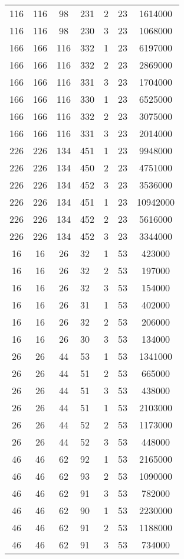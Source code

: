 \documentclass[a4paper,11pt]{article}
\begin{document}
\begin{longtable}{ |c|c|c|p{3cm}|c|c|c| }
116 & 116 & 98 & 231 & 2 & 23 & 1614000 \\
116 & 116 & 98 & 230 & 3 & 23 & 1068000 \\
166 & 166 & 116 & 332 & 1 & 23 & 6197000 \\
166 & 166 & 116 & 332 & 2 & 23 & 2869000 \\
166 & 166 & 116 & 331 & 3 & 23 & 1704000 \\
166 & 166 & 116 & 330 & 1 & 23 & 6525000 \\
166 & 166 & 116 & 332 & 2 & 23 & 3075000 \\
166 & 166 & 116 & 331 & 3 & 23 & 2014000 \\
226 & 226 & 134 & 451 & 1 & 23 & 9948000 \\
226 & 226 & 134 & 450 & 2 & 23 & 4751000 \\
226 & 226 & 134 & 452 & 3 & 23 & 3536000 \\
226 & 226 & 134 & 451 & 1 & 23 & 10942000 \\
226 & 226 & 134 & 452 & 2 & 23 & 5616000 \\
226 & 226 & 134 & 452 & 3 & 23 & 3344000 \\
16 & 16 & 26 & 32 & 1 & 53 & 423000 \\
16 & 16 & 26 & 32 & 2 & 53 & 197000 \\
16 & 16 & 26 & 32 & 3 & 53 & 154000 \\
16 & 16 & 26 & 31 & 1 & 53 & 402000 \\
16 & 16 & 26 & 32 & 2 & 53 & 206000 \\
16 & 16 & 26 & 30 & 3 & 53 & 134000 \\
26 & 26 & 44 & 53 & 1 & 53 & 1341000 \\
26 & 26 & 44 & 51 & 2 & 53 & 665000 \\
26 & 26 & 44 & 51 & 3 & 53 & 438000 \\
26 & 26 & 44 & 51 & 1 & 53 & 2103000 \\
26 & 26 & 44 & 52 & 2 & 53 & 1173000 \\
26 & 26 & 44 & 52 & 3 & 53 & 448000 \\
46 & 46 & 62 & 92 & 1 & 53 & 2165000 \\
46 & 46 & 62 & 93 & 2 & 53 & 1090000 \\
46 & 46 & 62 & 91 & 3 & 53 & 782000 \\
46 & 46 & 62 & 90 & 1 & 53 & 2230000 \\
46 & 46 & 62 & 91 & 2 & 53 & 1188000 \\
46 & 46 & 62 & 91 & 3 & 53 & 734000 \\

\end{longtable}
\end{document}

